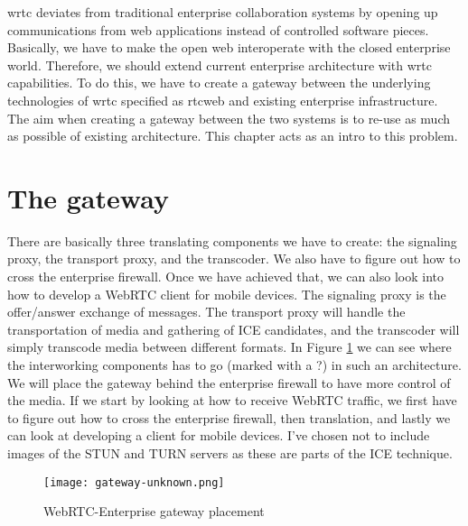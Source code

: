\gls{wrtc} deviates from traditional enterprise collaboration systems by opening up communications from web applications instead of controlled software pieces. Basically, we have to make the open web interoperate with the closed enterprise world. Therefore, we should extend current enterprise architecture with \gls{wrtc} capabilities. To do this, we have to create a gateway between the underlying technologies of \gls{wrtc} specified as \gls{rtcweb} and existing enterprise infrastructure. The aim when creating a gateway between the two systems is to re-use as much as possible of existing architecture. This chapter acts as an intro to this problem.

\section{The gateway}
There are basically three translating components we have to create: the signaling proxy, the transport proxy, and the transcoder. We also have to figure out how to cross the enterprise firewall. Once we have achieved that, we can also look into how to develop a WebRTC client for mobile devices. The signaling proxy is the offer/answer exchange of messages. The transport proxy will handle the transportation of media and gathering of ICE candidates, and the transcoder will simply transcode media between different formats. In Figure \ref{fig:gateway-layers} we can see where the interworking components has to go (marked with a ?) in such an architecture. We will place the gateway behind the enterprise firewall to have more control of the media. If we start by looking at how to receive WebRTC traffic, we first have to figure out how to cross the enterprise firewall, then translation, and lastly we can look at developing a client for mobile devices. I've chosen not to include images of the STUN and TURN servers as these are parts of the ICE technique.
\\
\begin{figure}[here]
\centerline{\texttt{[image: gateway-unknown.png]}}
\caption{WebRTC-Enterprise gateway placement}
\label{fig:gateway-layers}
\end{figure}


